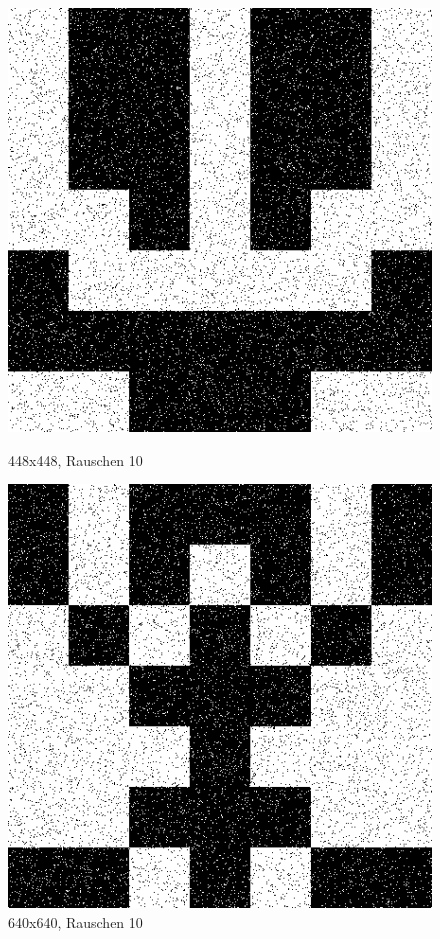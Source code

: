 \begin{figure}[hbt]
	\begin{minipage}{0.5 \textwidth}
		\includegraphics[width=\textwidth]{./Bilder/Auswertung/BeispielBilder/Picture_Example4_noise_10_pixelCnt_64_featureCnt_7}
		\caption{448x448, Rauschen 10}
	\end{minipage}
	\hfill
	\begin{minipage}{0.5 \textwidth}
		\includegraphics[width=\textwidth]{./Bilder/Auswertung/BeispielBilder/Picture_Example2_noise_10_pixelCnt_64_featureCnt_7}
		\caption{640x640, Rauschen 10}
	\end{minipage}
\end{figure}

